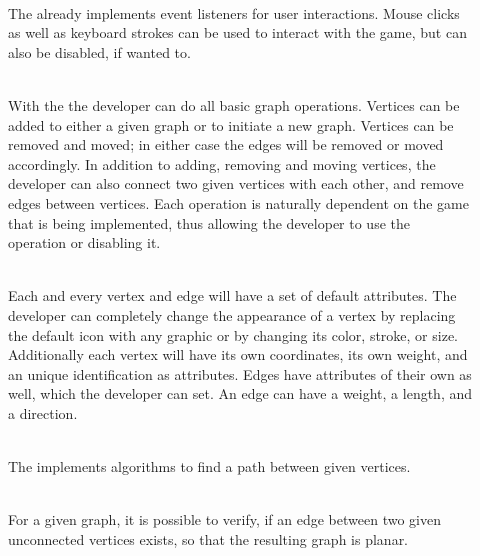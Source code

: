 \vspace{.5cm}
\begin{description}
	\item[] \textbf{} \\
	The {\graphioli}  already implements event listeners for user interactions. Mouse clicks as well as keyboard strokes can be used to interact with the game, but can also be disabled, if wanted to.
  	\item[] \textbf{}   \\
	With the {\graphioli} the developer can do all basic graph operations. Vertices can be added to either a given graph or to initiate a new graph. Vertices can be removed and moved; in either case the edges will be removed or moved accordingly. In addition to adding, removing and moving vertices, the developer can also connect two given vertices with each other, and remove edges between vertices. Each operation is naturally dependent on the game that is being implemented, thus allowing the developer to use the operation or disabling it.
	\item[] \textbf{}  \\
	Each and every vertex and edge will have a set of default attributes. The developer can completely change the appearance of a vertex by replacing the default icon with any graphic or by changing its color, stroke, or size. Additionally each vertex will have its own coordinates, its own weight, and an unique identification as attributes. Edges have attributes of their own as well, which the developer can set. An edge can have a weight, a length, and a direction.
	\item[] \textbf{}  \\
	The {\graphioli} implements algorithms to find a path between given vertices.
	\item[] \textbf{ }  \\
	For a given graph, it is possible to verify, if an edge between two given unconnected vertices exists, so that the resulting graph is planar. 
 	\item[] \textbf{}  \\

\end{description}
